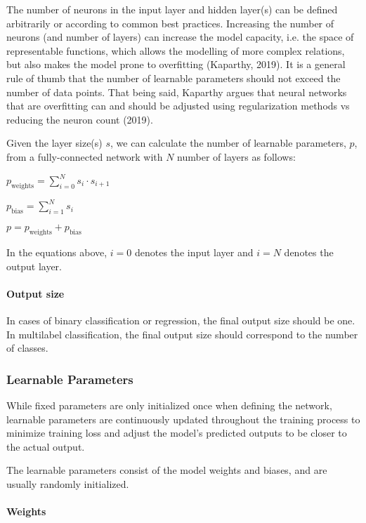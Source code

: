 \documentclass[11pt]{article}
\begin{document}
The number of neurons in the input layer and hidden layer(s) can be
defined arbitrarily or according to common best practices. Increasing
the number of neurons (and number of layers) can increase the model
capacity, i.e. the space of representable functions, which allows the
modelling of more complex relations, but also makes the model prone to
overfitting (Kaparthy, 2019). It is a general rule of thumb that the
number of learnable parameters should not exceed the number of data
points. That being said, Kaparthy argues that neural networks that are
overfitting can and should be adjusted using regularization methods vs
reducing the neuron count (2019).

Given the layer size(s) \(s\), we can calculate the number of learnable
parameters, \(p\), from a fully-connected network with \(N\) number of
layers as follows:

\(p_{\text{weights}} = \sum_{i=0}^{N}{s_{i}\cdot s_{i+1}}\)

\(p_{\text{bias}} = \sum_{i=1}^{N}{s_i}\)

\(p = p_{\text{weights}} + p_{\text{bias}}\)

In the equations above, \(i=0\) denotes the input layer and \(i=N\)
denotes the output layer.

\paragraph{Output size}\label{output-size}

In cases of binary classification or regression, the final output size
should be one. In multilabel classification, the final output size
should correspond to the number of classes.

\subsubsection{Learnable Parameters}\label{learnable-parameters}

While fixed parameters are only initialized once when defining the
network, learnable parameters are continuously updated throughout the
training process to minimize training loss and adjust the model's
predicted outputs to be closer to the actual output.

The learnable parameters consist of the model weights and biases, and
are usually randomly initialized.

\paragraph{Weights}\label{weights}
\end{document}
